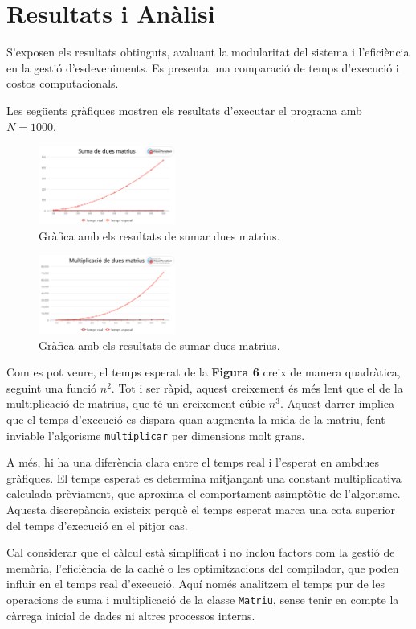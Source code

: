 \documentclass{ieeetj}
\begin{document}
\section{Resultats i Anàlisi}
S'exposen els resultats obtinguts, avaluant la modularitat del sistema i l’eficiència en la gestió d'esdeveniments. Es presenta una comparació de temps d’execució i costos computacionals.

Les següents gràfiques mostren els resultats d'executar el programa amb $N = 1000$.
\begin{figure}[htbp]
\centerline{\includegraphics[width=0.4\textwidth]{docs/png/figuera6.png}}
\caption{Gràfica amb els resultats de sumar dues matrius.}
\label{fig:int2}
\end{figure}

\begin{figure}[htbp]
\centerline{\includegraphics[width=0.4\textwidth]{docs/png/figuera7.png}}
\caption{Gràfica amb els resultats de sumar dues matrius.}
\label{fig:int2}
\end{figure}
Com es pot veure, el temps esperat de la \textbf{Figura 6} creix de manera quadràtica, seguint una funció $n^2$. Tot i ser ràpid, aquest creixement és més lent que el de la multiplicació de matrius, que té un creixement cúbic $n^3$. Aquest darrer implica que el temps d'execució es dispara quan augmenta la mida de la matriu, fent inviable l'algorisme \texttt{multiplicar} per dimensions molt grans.

A més, hi ha una diferència clara entre el temps real i l’esperat en ambdues gràfiques. El temps esperat es determina mitjançant una constant multiplicativa calculada prèviament, que aproxima el comportament asimptòtic de l’algorisme. Aquesta discrepància existeix perquè el temps esperat marca una cota superior del temps d’execució en el pitjor cas.

Cal considerar que el càlcul està simplificat i no inclou factors com la gestió de memòria, l’eficiència de la caché o les optimitzacions del compilador, que poden influir en el temps real d’execució. Aquí només analitzem el temps pur de les operacions de suma i multiplicació de la classe \texttt{Matriu}, sense tenir en compte la càrrega inicial de dades ni altres processos interns.
\end{document}
